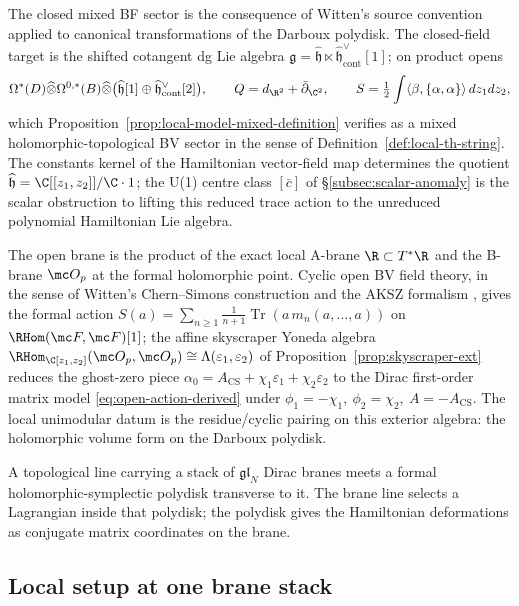 \documentclass[11pt]{memoir}
\begin{document}
The closed mixed BF sector is the consequence of Witten's source
convention applied to canonical transformations of the Darboux polydisk.
The closed-field target is the shifted cotangent dg Lie algebra
\(\mathfrak g=\widehat{\mathfrak h}\ltimes
\widehat{\mathfrak h}^\vee_{\mathrm{cont}}[1]\); on product opens
\[
  \Omega^*(D)\widehat\otimes\Omega^{0,*}(B)\widehat\otimes
  \bigl(\widehat{\mathfrak h}[1]\oplus
  \widehat{\mathfrak h}^\vee_{\mathrm{cont}}[2]\bigr),
  \qquad
  Q=d_{\R^2}+\bar\partial_{\C^2},
  \qquad
  S=\tfrac12\int\langle\beta,\{\alpha,\alpha\}\rangle\,dz_1dz_2,
\]
which Proposition~\ref{prop:local-model-mixed-definition} verifies as a
mixed holomorphic-topological BV sector in the sense of
Definition~\ref{def:local-th-string}.  The constants kernel of the
Hamiltonian vector-field map determines the quotient
\(\widehat{\mathfrak h}=\C[[z_1,z_2]]/\C\cdot1\); the U(1) centre class
\([\bar c]\) of \S\ref{subsec:scalar-anomaly} is the scalar obstruction
to lifting this reduced trace action to the unreduced polynomial
Hamiltonian Lie algebra.

The open brane is the product of the exact local A-brane
\(\R\subset T^*\R\) and the B-brane \(\mc O_p\) at the formal
  holomorphic point.  Cyclic open BV field theory, in the sense of
  Witten's Chern--Simons construction \cite{witten-cs} and the AKSZ
  formalism \cite{aksz}, gives the formal action
\(S(a)=\sum_{n\ge1}\tfrac{1}{n+1}\operatorname{Tr}(a\,m_n(a,\ldots,a))\)
on \(\RHom(\mc F,\mc F)[1]\); the affine skyscraper Yoneda algebra
\(\RHom_{\C[z_1,z_2]}(\mc O_p,\mc O_p)
\cong\Lambda(\varepsilon_1,\varepsilon_2)\)
of Proposition~\ref{prop:skyscraper-ext} reduces the ghost-zero piece
\(\alpha_0=A_{\mathrm{CS}}+\chi_1\varepsilon_1+\chi_2\varepsilon_2\)
to the Dirac first-order matrix model \eqref{eq:open-action-derived}
under
\(\phi_1=-\chi_1,\ \phi_2=\chi_2,\ A=-A_{\mathrm{CS}}\).  The local
unimodular datum is the residue/cyclic pairing on this exterior
  algebra: the holomorphic volume form on the Darboux polydisk.

A topological line carrying a stack of \(\mathfrak{gl}_N\) Dirac
branes meets a formal holomorphic-symplectic polydisk transverse to
it.  The brane line selects a Lagrangian inside that polydisk; the
polydisk gives the Hamiltonian deformations as conjugate matrix
coordinates on the brane.

\subsection{Local setup at one brane stack}\label{ssec:local-setup}
\end{document}
